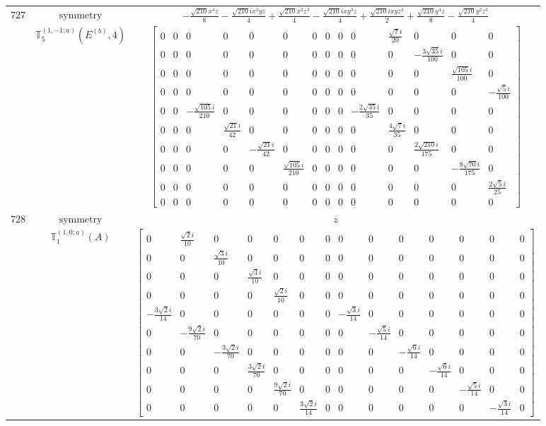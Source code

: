 \documentclass[fleqn,8pt,landscape]{jsarticle}
\begin{document}
\begin{longtable}{ccc}
$ 727 $ & $ \text{symmetry} $ & $ - \frac{\sqrt{210} x^{4} z}{8} - \frac{\sqrt{210} i x^{3} y z}{4} + \frac{\sqrt{210} x^{2} z^{3}}{4} - \frac{\sqrt{210} i x y^{3} z}{4} + \frac{\sqrt{210} i x y z^{3}}{2} + \frac{\sqrt{210} y^{4} z}{8} - \frac{\sqrt{210} y^{2} z^{3}}{4} $ \\
$  $ & $ \mathbb{T}_{5}^{(1,-1;a)}(E^{(b)},4) $ & $ \begin{bmatrix} 0 & 0 & 0 & 0 & 0 & 0 & 0 & 0 & 0 & 0 & \frac{\sqrt{7} i}{20} & 0 & 0 & 0 \\ 0 & 0 & 0 & 0 & 0 & 0 & 0 & 0 & 0 & 0 & 0 & - \frac{3 \sqrt{35} i}{100} & 0 & 0 \\ 0 & 0 & 0 & 0 & 0 & 0 & 0 & 0 & 0 & 0 & 0 & 0 & \frac{\sqrt{105} i}{100} & 0 \\ 0 & 0 & 0 & 0 & 0 & 0 & 0 & 0 & 0 & 0 & 0 & 0 & 0 & - \frac{\sqrt{5} i}{100} \\ 0 & 0 & - \frac{\sqrt{105} i}{210} & 0 & 0 & 0 & 0 & 0 & 0 & - \frac{2 \sqrt{35} i}{35} & 0 & 0 & 0 & 0 \\ 0 & 0 & 0 & \frac{\sqrt{21} i}{42} & 0 & 0 & 0 & 0 & 0 & 0 & \frac{4 \sqrt{7} i}{35} & 0 & 0 & 0 \\ 0 & 0 & 0 & 0 & - \frac{\sqrt{21} i}{42} & 0 & 0 & 0 & 0 & 0 & 0 & \frac{2 \sqrt{210} i}{175} & 0 & 0 \\ 0 & 0 & 0 & 0 & 0 & \frac{\sqrt{105} i}{210} & 0 & 0 & 0 & 0 & 0 & 0 & - \frac{8 \sqrt{70} i}{175} & 0 \\ 0 & 0 & 0 & 0 & 0 & 0 & 0 & 0 & 0 & 0 & 0 & 0 & 0 & \frac{2 \sqrt{5} i}{25} \\ 0 & 0 & 0 & 0 & 0 & 0 & 0 & 0 & 0 & 0 & 0 & 0 & 0 & 0 \end{bmatrix} $ \\ \hline
$ 728 $ & $ \text{symmetry} $ & $ z $ \\
$  $ & $ \mathbb{T}_{1}^{(1,0;a)}(A) $ & $ \begin{bmatrix} 0 & \frac{\sqrt{2} i}{10} & 0 & 0 & 0 & 0 & 0 & 0 & 0 & 0 & 0 & 0 & 0 & 0 \\ 0 & 0 & \frac{\sqrt{3} i}{10} & 0 & 0 & 0 & 0 & 0 & 0 & 0 & 0 & 0 & 0 & 0 \\ 0 & 0 & 0 & \frac{\sqrt{3} i}{10} & 0 & 0 & 0 & 0 & 0 & 0 & 0 & 0 & 0 & 0 \\ 0 & 0 & 0 & 0 & \frac{\sqrt{2} i}{10} & 0 & 0 & 0 & 0 & 0 & 0 & 0 & 0 & 0 \\ - \frac{3 \sqrt{2} i}{14} & 0 & 0 & 0 & 0 & 0 & 0 & - \frac{\sqrt{3} i}{14} & 0 & 0 & 0 & 0 & 0 & 0 \\ 0 & - \frac{9 \sqrt{2} i}{70} & 0 & 0 & 0 & 0 & 0 & 0 & - \frac{\sqrt{5} i}{14} & 0 & 0 & 0 & 0 & 0 \\ 0 & 0 & - \frac{3 \sqrt{2} i}{70} & 0 & 0 & 0 & 0 & 0 & 0 & - \frac{\sqrt{6} i}{14} & 0 & 0 & 0 & 0 \\ 0 & 0 & 0 & \frac{3 \sqrt{2} i}{70} & 0 & 0 & 0 & 0 & 0 & 0 & - \frac{\sqrt{6} i}{14} & 0 & 0 & 0 \\ 0 & 0 & 0 & 0 & \frac{9 \sqrt{2} i}{70} & 0 & 0 & 0 & 0 & 0 & 0 & - \frac{\sqrt{5} i}{14} & 0 & 0 \\ 0 & 0 & 0 & 0 & 0 & \frac{3 \sqrt{2} i}{14} & 0 & 0 & 0 & 0 & 0 & 0 & - \frac{\sqrt{3} i}{14} & 0 \end{bmatrix} $ \\ \hline

\end{longtable}
\end{document}
